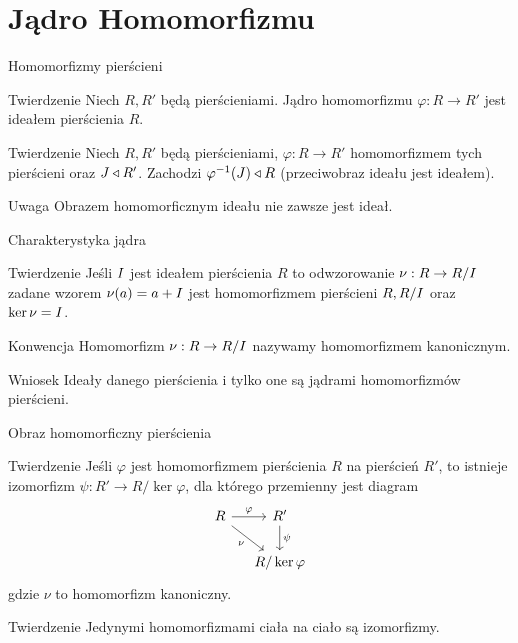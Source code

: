 \documentclass{beamer}
\newcommand{\II}{\mathnormal{I}}
\newcommand{\JJ}{\mathnormal{J}}
\let\phi\varphi
\begin{document}
\section{Jądro Homomorfizmu}
\begin{frame}{Homomorfizmy pierścieni}
    \begin{block}{Twierdzenie}
        Niech $R, R'$ będą pierścieniami. Jądro homomorfizmu $\phi : R \rightarrow R'$ jest ideałem pierścienia $R$.
    \end{block}
    \pause 
    \begin{block}{Twierdzenie}
        Niech $R, R'$ będą pierścieniami, $\phi : R \rightarrow R'$ homomorfizmem tych pierścieni oraz $\JJ \triangleleft R'$. Zachodzi $\phi^{-1}(\JJ) \triangleleft R$ (przeciwobraz ideału jest ideałem).
    \end{block}
    \pause
    \begin{alertblock}{Uwaga}
        Obrazem homomorficznym ideału \alert{nie zawsze} jest ideał.
    \end{alertblock}
\end{frame}

\begin{frame}{Charakterystyka jądra}
    \begin{block}{Twierdzenie}
        Jeśli $\II$ jest ideałem pierścienia $R$ to odwzorowanie $\nu : R \rightarrow R/\II$ zadane wzorem $\nu(a) = a + \II$ jest homomorfizmem pierścieni $R, R/\II$ oraz $\ker \nu = \II$. 
    \end{block}
    \pause
    \begin{alertblock}{Konwencja}
        Homomorfizm $\nu : R \rightarrow R/\II$ nazywamy homomorfizmem kanonicznym.
    \end{alertblock}
    \pause 
    \begin{alertblock}{Wniosek}
        Ideały danego pierścienia i tylko one są jądrami homomorfizmów pierścieni.
    \end{alertblock}
\end{frame}

\begin{frame}{Obraz homomorficzny pierścienia}
    \begin{block}{Twierdzenie}
        Jeśli $\phi$ jest homomorfizmem pierścienia $R$ na pierścień $R'$, to istnieje izomorfizm $\psi : R' \rightarrow R/\ker\phi$,
        dla którego przemienny jest diagram 
        $$
            \begin{tikzcd}[ampersand replacement=\&, column sep=small]
                R \arrow[r, "\phi"]  \arrow[rd, "\nu"'] \& R' \arrow[d, "\psi"] \\
                \& R / \ker \phi
            \end{tikzcd}
        $$   
        gdzie $\nu$ to homomorfizm kanoniczny.
    \end{block}
    \pause
    \begin{block}{Twierdzenie}
        Jedynymi homomorfizmami ciała na ciało są izomorfizmy. 
    \end{block}
\end{frame}
\end{document}
